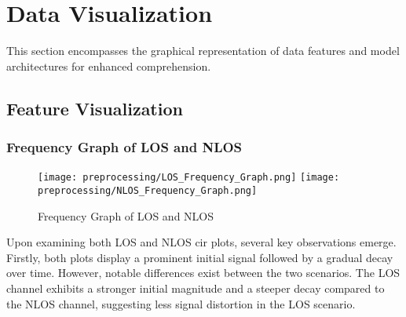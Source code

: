 \section{Data Visualization}\label{data_visualisation}

This section encompasses the graphical representation of data features and model architectures for enhanced comprehension.




\subsection{Feature Visualization}\label{feature_visualization}

\subsubsection{Frequency Graph of LOS and NLOS}\label{frequency_graph}

\begin{figure}[H] 
	\centering
	\texttt{[image: preprocessing/LOS\_Frequency\_Graph.png]}
	\texttt{[image: preprocessing/NLOS\_Frequency\_Graph.png]}
	\caption{Frequency Graph of LOS and NLOS}\label{fig:frequency_graph}
\end{figure}


Upon examining both LOS and NLOS \acrshort{cir} plots, several key observations emerge. Firstly, both plots display a prominent initial signal followed by a gradual decay over time. However, notable differences exist between the two scenarios. The LOS channel exhibits a stronger initial magnitude and a steeper decay compared to the NLOS channel, suggesting less signal distortion in the LOS scenario.

